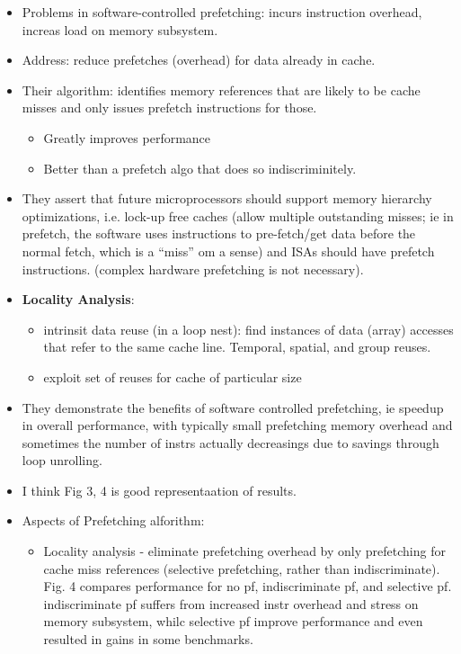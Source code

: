\documentclass [12pt]{article}
\begin{document}
        \begin{itemize}
            \item Problems in software-controlled prefetching: incurs instruction overhead, increas load on memory subsystem. 
            \item Address: reduce prefetches (overhead) for data already in cache. 
            \item Their algorithm: identifies memory references that are likely to be cache misses and only issues prefetch instructions for those.
                \begin{itemize}
                    \item Greatly improves performance
                    \item Better than a prefetch algo that does so indiscriminitely. 
                \end{itemize}
            \item They assert that future microprocessors should support memory hierarchy optimizations, i.e. lock-up free caches (allow multiple outstanding misses; ie in prefetch, the software uses instructions to pre-fetch/get data before the normal fetch, which is a ``miss'' om a sense) and ISAs should have prefetch instructions. (complex hardware prefetching is not necessary).
            \item \textbf{Locality Analysis}:
                \begin{itemize}
                    \item intrinsit data reuse (in a loop nest): find instances of data (array) accesses that refer to the same cache line. Temporal, spatial, and group reuses. 
                    \item exploit set of reuses for cache of particular size
                \end{itemize}
            \item They demonstrate the benefits of software controlled prefetching, ie speedup in overall performance, with typically small prefetching memory overhead and sometimes the number of instrs actually decreasings due to savings through loop unrolling.
            \item I think Fig 3, 4 is good representaation of results. 
            \item Aspects of Prefetching alforithm:
                \begin{itemize}
                    \item Locality analysis - eliminate prefetching overhead by only prefetching for cache miss references (selective prefetching, rather than indiscriminate). Fig. 4 compares performance for no pf, indiscriminate pf, and selective pf. indiscriminate pf suffers from increased instr overhead and stress on memory subsystem, whilc selective pf improve performance and even resulted in gains in some benchmarks. 

\end{itemize}
\end{itemize}
\end{document}
